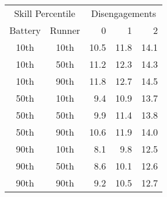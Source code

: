 \begin{tabular}{cc|rrr}
\multicolumn{2}{c|}{Skill Percentile} & \multicolumn{3}{c}{Disengagements}\\
Battery & Runner & 0 & 1 & 2 \\
  \hline
10th & 10th & 10.5 & 11.8 & 14.1 \\ 
  10th & 50th & 11.2 & 12.3 & 14.3 \\ 
  10th & 90th & 11.8 & 12.7 & 14.5 \\ 
   \hline
50th & 10th & 9.4 & 10.9 & 13.7 \\ 
  50th & 50th & 9.9 & 11.4 & 13.8 \\ 
  50th & 90th & 10.6 & 11.9 & 14.0 \\ 
   \hline
90th & 10th & 8.1 & 9.8 & 12.5 \\ 
  90th & 50th & 8.6 & 10.1 & 12.6 \\ 
  90th & 90th & 9.2 & 10.5 & 12.7 \\ 
\end{tabular}
